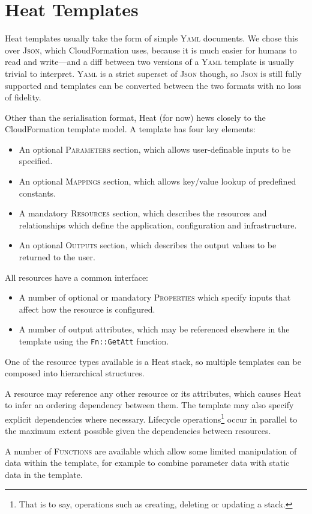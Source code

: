 \section{Heat Templates}

Heat templates usually take the form of simple \textsc{Yaml} documents. We chose this over \textsc{Json}, which CloudFormation uses, because it is much easier for humans to read and write---and a diff between two versions of a \textsc{Yaml} template is usually trivial to interpret. \textsc{Yaml} is a strict superset of \textsc{Json} though, so \textsc{Json} is still fully supported and templates can be converted between the two formats with no loss of fidelity.

Other than the serialisation format, Heat (for now) hews closely to the CloudFormation template model. A template has four key elements:

\begin{itemize}
\item An optional \textsc{Parameters} section, which allows user-definable inputs to be specified.
\item An optional \textsc{Mappings} section, which allows key/value lookup of predefined constants.
\item A mandatory \textsc{Resources} section, which describes the resources and relationships which define the application, configuration and infrastructure.
\item An optional \textsc{Outputs} section, which describes the output values to be returned to the user.
\end{itemize}

All resources have a common interface:

\begin{itemize}
\item A number of optional or mandatory \textsc{Properties} which specify inputs that affect how the resource is configured.
\item A number of output attributes, which may be referenced elsewhere in the template using the \texttt{Fn::GetAtt} function.
\end{itemize}

One of the resource types available is a Heat stack, so multiple templates can be composed into hierarchical structures.

A resource may reference any other resource or its attributes, which causes Heat to infer an ordering dependency between them. The template may also specify explicit dependencies where necessary. Lifecycle operations\footnote{That is to say, operations such as creating, deleting or updating a stack.} occur in parallel to the maximum extent possible given the dependencies between resources.

A number of \textsc{Functions} are available which allow some limited manipulation of data within the template, for example to combine parameter data with static data in the template.
